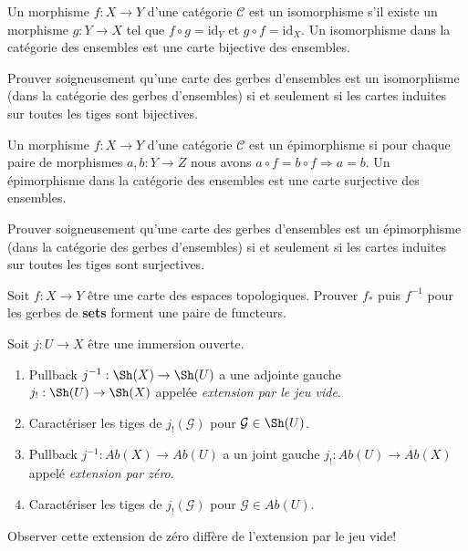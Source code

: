 \noindent
Un morphisme $f : X \to Y$ d'une catégorie $\mathcal{C}$ est un isomorphisme {\it} s'il
existe un morphisme $g : Y \to X$ tel que $f \circ g = \text{id}_Y$
et $g \circ f = \text{id}_X$. Un isomorphisme dans la catégorie des ensembles est
une carte bijective des ensembles.

\begin{exercise}
\label{exercise-isomorphism-sheaves-sets}
Prouver soigneusement qu'une carte des gerbes d'ensembles est un isomorphisme (dans
la catégorie des gerbes d'ensembles) si et seulement si les cartes induites sur
toutes les tiges sont bijectives.
\end{exercise}

\noindent
Un morphisme $f : X \to Y$ d'une catégorie $\mathcal{C}$ est un épimorphisme {\it} si pour
chaque paire de morphismes $a, b : Y \to Z$ nous avons
$a \circ f = b \circ f \Rightarrow a = b$. Un épimorphisme dans
la catégorie des ensembles est une carte surjective des ensembles.

\begin{exercise}
\label{exercise-epi-sheaves-sets}
Prouver soigneusement qu'une carte des gerbes d'ensembles est un épimorphisme (dans
la catégorie des gerbes d'ensembles) si et seulement si les cartes induites sur
toutes les tiges sont surjectives.
\end{exercise}

\begin{exercise}
\label{exercise-adjoint-push-pull}
Soit $f : X \to Y$ être une
carte des espaces topologiques. Prouver $f_\ast$ puis $f^{-1}$ pour les gerbes de {\bf
sets} forment une paire de functeurs.
\end{exercise}

\begin{exercise}
\label{exercise-j-shriek}
Soit $j : U \to X$ être une immersion ouverte.
\begin{enumerate}
\item Pullback $j^{-1} : \Sh(X) \to \Sh(U)$ a une adjointe gauche
$j_{!} : \Sh(U) \to \Sh(X)$ appelée {\it extension par le jeu vide}.
\item Caractériser les tiges de $j_{!}({\mathcal G})$ pour
$\mathcal{G} \in \Sh(U)$.
\item Pullback $j^{-1} : \textit{Ab}(X) \to \textit{Ab}(U)$ a un joint gauche
$j_{!} : \textit{Ab}(U) \to \textit{Ab}(X)$ appelé {\it extension par zéro}.
\item Caractériser les tiges de $j_{!}({\mathcal G})$
pour $\mathcal{G} \in \textit{Ab}(U)$.
\end{enumerate}
Observer cette extension de zéro diffère de l'extension par le
jeu vide!
\end{exercise}

